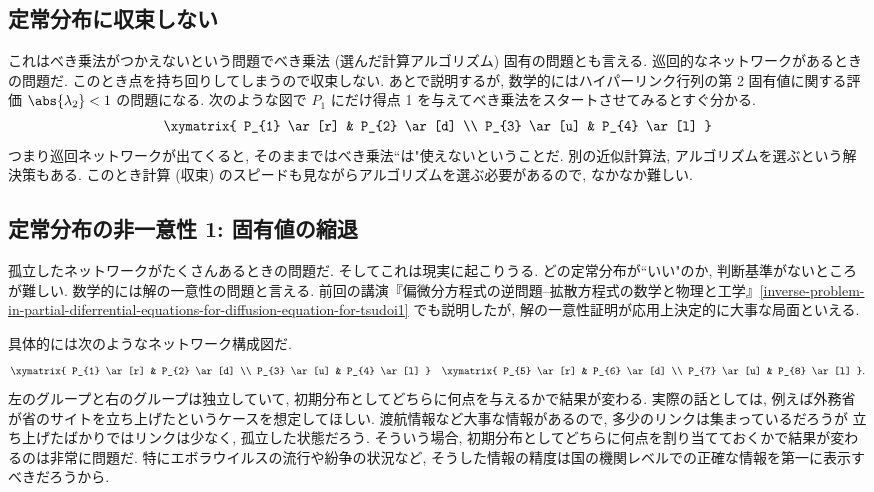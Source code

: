 \documentclass[openany, a4paper, oneside]{jsbook}
\begin{document}
\subsection{定常分布に収束しない}

これはべき乗法がつかえないという問題でべき乗法 (選んだ計算アルゴリズム) 固有の問題とも言える.
巡回的なネットワークがあるときの問題だ.
このとき点を持ち回りしてしまうので収束しない.
あとで説明するが, 数学的にはハイパーリンク行列の第 2 固有値に関する評価 $\abs{\lambda_2} < 1$ の問題になる.
次のような図で $P_1$ にだけ得点 1 を与えてべき乗法をスタートさせてみるとすぐ分かる.
\begin{align}
 \xymatrix{
  P_{1} \ar[r] & P_{2} \ar[d] \\
  P_{3} \ar[u] & P_{4} \ar[l]
 }
\end{align}
つまり巡回ネットワークが出てくると, そのままではべき乗法``は"使えないということだ.
別の近似計算法, アルゴリズムを選ぶという解決策もある.
このとき計算 (収束) のスピードも見ながらアルゴリズムを選ぶ必要があるので, なかなか難しい.
\subsection{定常分布の非一意性 1: 固有値の縮退}

孤立したネットワークがたくさんあるときの問題だ.
そしてこれは現実に起こりうる.
どの定常分布が``いい"のか, 判断基準がないところが難しい.
数学的には解の一意性の問題と言える.
前回の講演『偏微分方程式の逆問題--拡散方程式の数学と物理と工学』\ref{inverse-problem-in-partial-diferrential-equations-for-diffusion-equation-for-tsudoi1} でも説明したが,
解の一意性証明が応用上決定的に大事な局面といえる.

具体的には次のようなネットワーク構成図だ.
\begin{align}
 \xymatrix{
  P_{1} \ar[r] & P_{2} \ar[d] \\
  P_{3} \ar[u] & P_{4} \ar[l]
 }
 \quad
 \xymatrix{
  P_{5} \ar[r] & P_{6} \ar[d] \\
  P_{7} \ar[u] & P_{8} \ar[l]
 }.
\end{align}
左のグループと右のグループは独立していて,
初期分布としてどちらに何点を与えるかで結果が変わる.
実際の話としては, 例えば外務省が省のサイトを立ち上げたというケースを想定してほしい.
渡航情報など大事な情報があるので, 多少のリンクは集まっているだろうが
立ち上げたばかりではリンクは少なく, 孤立した状態だろう.
そういう場合, 初期分布としてどちらに何点を割り当てておくかで結果が変わるのは非常に問題だ.
特にエボラウイルスの流行や紛争の状況など,
そうした情報の精度は国の機関レベルでの正確な情報を第一に表示すべきだろうから.
\end{document}
